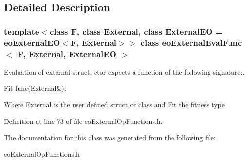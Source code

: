 \subsection{Detailed Description}
\subsubsection*{template$<$class F, class External, class External\-EO = eo\-External\-EO$<$F, External$>$$>$ class eo\-External\-Eval\-Func$<$ F, External, External\-EO $>$}

Evaluation of external struct, ctor expects a function of the following signature:. 

Fit func(External\&);

Where External is the user defined struct or class and Fit the fitness type 



Definition at line 73 of file eo\-External\-Op\-Functions.h.

The documentation for this class was generated from the following file:\begin{CompactItemize}
\item 
eo\-External\-Op\-Functions.h\end{CompactItemize}
